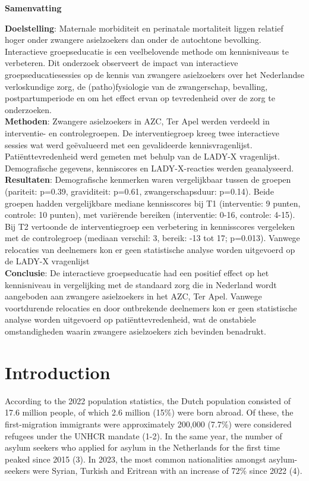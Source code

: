\documentclass[12pt]{article}
\begin{document}
\centerline{\textbf{Samenvatting}}
\noindent \textbf{Doelstelling}: Maternale morbiditeit en perinatale mortaliteit liggen relatief hoger onder zwangere asielzoekers dan onder de autochtone bevolking. Interactieve groepseducatie is een veelbelovende methode om kennisniveaus te verbeteren. Dit onderzoek observeert de impact van interactieve groepseducatiesessies op de kennis van zwangere asielzoekers over het Nederlandse verloskundige zorg, de (patho)fysiologie van de zwangerschap, bevalling, postpartumperiode en om het effect ervan op tevredenheid over de zorg te onderzoeken.\\
\noindent \textbf{Methoden}: Zwangere asielzoekers in AZC, Ter Apel werden verdeeld in interventie- en controlegroepen. De interventiegroep kreeg twee interactieve sessies wat werd geëvalueerd met een gevalideerde kennisvragenlijst. Patiënttevredenheid werd gemeten met behulp van de LADY-X vragenlijst. Demografische gegevens, kenniscores en LADY-X-reacties werden geanalyseerd.\\
\noindent \textbf{Resultaten}: Demografische kenmerken waren vergelijkbaar tussen de groepen (pariteit: p=0.39, graviditeit: p=0.61, zwangerschapsduur: p=0.14). Beide groepen hadden vergelijkbare mediane kennisscores bij T1 (interventie: 9 punten, controle: 10 punten), met variërende bereiken (interventie: 0-16, controle: 4-15). Bij T2 vertoonde de interventiegroep een verbetering in kennisscores vergeleken met de controlegroep (mediaan verschil: 3, bereik: -13 tot 17; p=0.013). Vanwege relocaties van deelnemers kon er geen statistische analyse worden uitgevoerd op de LADY-X vragenlijst\\
\noindent \textbf{Conclusie}: De interactieve groepseducatie had een positief effect op het kennisniveau in vergelijking met de standaard zorg die in Nederland wordt aangeboden aan zwangere asielzoekers in het AZC, Ter Apel. Vanwege voortdurende relocaties en door ontbrekende deelnemers kon er geen statistische analyse worden uitgevoerd op patiënttevredenheid, wat de onstabiele omstandigheden waarin zwangere asielzoekers zich bevinden benadrukt. \\

\newpage
\tableofcontents

\newpage
\section{Introduction}
\noindent According to the 2022 population statistics, the Dutch population consisted of 17.6 million people, of which 2.6 million (15\%) were born abroad. Of these, the first-migration immigrants were approximately 200,000 (7.7\%) were considered refugees under the UNHCR mandate (1-2). In the same year, the number of asylum seekers who applied for asylum in the Netherlands for the first time peaked since 2015 (3). In 2023, the most common nationalities amongst asylum-seekers were Syrian, Turkish and Eritrean with an increase of 72\% since 2022 (4). \\
\end{document}
